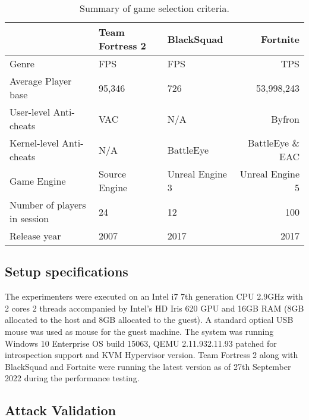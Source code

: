 \begin{table}[h]
\centering
\begin{tabular}{lllr}
\toprule
& Team Fortress 2 &  BlackSquad & Fortnite \\
\toprule
Genre &FPS & FPS &TPS \\
Average Player base &95,346 & 726  & 53,998,243 \\
User-level Anti-cheats    & VAC  &N/A &Byfron \\
Kernel-level Anti-cheats & N/A  & BattleEye & BattleEye \& EAC \\
Game Engine &Source Engine  &  Unreal Engine 3 & Unreal Engine 5 \\
Number of players in session  &24 &12 &100 \\           
Release year     &2007 & 2017 & 2017 \\    
\bottomrule
\end{tabular}
\caption{Summary of game selection criteria.}
\label{table:summaryGameSelectionCriteria}
\end{table}


\subsection{Setup specifications}\label{specs}

The experimenters were executed on an Intel i7 7th generation CPU 2.9GHz with 2 cores 2 threads accompanied by Intel's HD Iris 620 GPU and 16GB RAM (8GB allocated to the host and 8GB allocated to the guest). A standard optical USB mouse was used as mouse for the guest machine. The system was running Windows 10 Enterprise OS build 15063, QEMU 2.11.932.11.93 patched for introspection support and KVM Hypervisor version. Team Fortress 2 along with BlackSquad and Fortnite were running the latest version as of 27th September 2022 during the performance testing.

\subsection{Attack Validation} 
\label{attack-validation}
 
